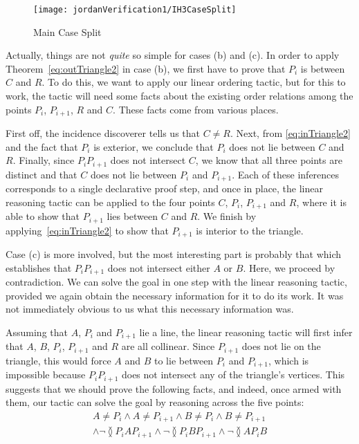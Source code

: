 \begin{figure}
\centering\texttt{[image: jordanVerification1/IH3CaseSplit]}
\caption{Main Case Split}
\label{fig:IH3CaseSplit}
\end{figure}

Actually, things are not \emph{quite} so simple for cases (b) and (c). In order to apply Theorem~\ref{eq:outTriangle2} in case (b), we first have to prove that $P_i$ is between $C$ and $R$. To do this, we want to apply our linear ordering tactic, but for this to work, the tactic will need some facts about the existing order relations among the points $P_i$, $P_{i+1}$, $R$ and $C$. These facts come from various places.

First off, the incidence discoverer tells us that $C \neq R$. Next, from \eqref{eq:inTriangle2} and the fact that $P_i$ is exterior, we conclude that $P_i$ does not lie between $C$ and $R$. Finally, since $P_iP_{i+1}$ does not intersect $C$, we know that all three points are distinct and that $C$ does not lie between $P_i$ and $P_{i+1}$. Each of these inferences corresponds to a single declarative proof step, and once in place, the linear reasoning tactic can be applied to the four points $C$, $P_i$, $P_{i+1}$ and $R$, where it is able to show that $P_{i+1}$ lies between $C$ and $R$. We finish by applying~\eqref{eq:inTriangle2} to show that $P_{i+1}$ is interior to the triangle.

Case (c) is more involved, but the most interesting part is probably that which establishes that $P_iP_{i+1}$ does not intersect either $A$ or $B$. Here, we proceed by contradiction. We can solve the goal in one step with the linear reasoning tactic, provided we again obtain the necessary information for it to do its work. It was not immediately obvious to us what this necessary information was.

Assuming that $A$, $P_i$ and $P_{i+1}$ lie a line, the linear reasoning tactic will first infer that $A$, $B$, $P_i$, $P_{i+1}$ and $R$ are all collinear. Since $P_{i+1}$ does not lie on the triangle, this would force $A$ and $B$ to lie between $P_i$ and $P_{i+1}$, which is impossible because $P_iP_{i+1}$ does not intersect any of the triangle's vertices. This suggests that we should prove the following facts, and indeed, once armed with them, our tactic can solve the goal by reasoning across the five points:
\begin{multline}
A \neq P_i \wedge A \neq P_{i+1} \wedge B \neq P_i \wedge B \neq P_{i+1}\\ \wedge \neg\between{P_i}{A}{P_{i+1}} \wedge \neg\between{P_i}{B}{P_{i+1}} \wedge \neg\between{A}{P_i}{B}
\end{multline}

